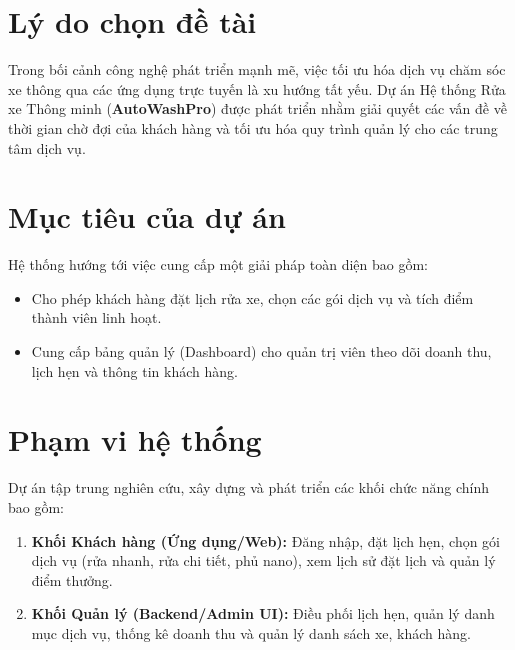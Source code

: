 \section{Lý do chọn đề tài}
Trong bối cảnh công nghệ phát triển mạnh mẽ, việc tối ưu hóa dịch vụ chăm sóc xe thông qua các ứng dụng trực tuyến là xu hướng tất yếu. Dự án Hệ thống Rửa xe Thông minh (\textbf{AutoWashPro}) được phát triển nhằm giải quyết các vấn đề về thời gian chờ đợi của khách hàng và tối ưu hóa quy trình quản lý cho các trung tâm dịch vụ.

\section{Mục tiêu của dự án}
Hệ thống hướng tới việc cung cấp một giải pháp toàn diện bao gồm:
\begin{itemize}
    \item Cho phép khách hàng đặt lịch rửa xe, chọn các gói dịch vụ và tích điểm thành viên linh hoạt.
    \item Cung cấp bảng quản lý (Dashboard) cho quản trị viên theo dõi doanh thu, lịch hẹn và thông tin khách hàng.
\end{itemize}

\section{Phạm vi hệ thống}
Dự án tập trung nghiên cứu, xây dựng và phát triển các khối chức năng chính bao gồm:
\begin{enumerate}
    \item \textbf{Khối Khách hàng (Ứng dụng/Web):} Đăng nhập, đặt lịch hẹn, chọn gói dịch vụ (rửa nhanh, rửa chi tiết, phủ nano), xem lịch sử đặt lịch và quản lý điểm thưởng.
    \item \textbf{Khối Quản lý (Backend/Admin UI):} Điều phối lịch hẹn, quản lý danh mục dịch vụ, thống kê doanh thu và quản lý danh sách xe, khách hàng.
\end{enumerate}